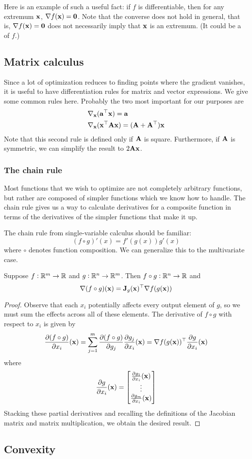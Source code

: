 Here is an example of such a useful fact: if $f$ is differentiable, then for any extremum $\mathbf{x}$, $\nabla f(\mathbf{x}) = \mathbf{0}$.
Note that the converse does not hold in general, that is, $\nabla f(\mathbf{x}) = \mathbf{0}$ does not necessarily imply that $\mathbf{x}$ is an extremum.
(It could be a  of $f$.)

\subsection{Matrix calculus}
Since a lot of optimization reduces to finding points where the gradient vanishes, it is useful to have differentiation rules for matrix and vector expressions.
We give some common rules here.
Probably the two most important for our purposes are
\begin{align*}
\nabla_{\mathbf{x}} &(\mathbf{a}^\top\mathbf{x}) = \mathbf{a} \\
\nabla_{\mathbf{x}} &(\mathbf{x}^\top\mathbf{A}\mathbf{x}) = (\mathbf{A} + \mathbf{A}^\top)\mathbf{x}
\end{align*}
Note that this second rule is defined only if $\mathbf{A}$ is square.
Furthermore, if $\mathbf{A}$ is symmetric, we can simplify the result to $2\mathbf{A}\mathbf{x}$.

\subsubsection{The chain rule}
Most functions that we wish to optimize are not completely arbitrary functions, but rather are composed of simpler functions which we know how to handle.
The chain rule gives us a way to calculate derivatives for a composite function in terms of the derivatives of the simpler functions that make it up.

The chain rule from single-variable calculus should be familiar:
\[(f \circ g)'(x) = f'(g(x))g'(x)\]
where $\circ$ denotes function composition.
We can generalize this to the multivariate case.
\begin{proposition}
Suppose $f : \mathbb{R}^m \to \mathbb{R}$ and $g : \mathbb{R}^n \to \mathbb{R}^m$. Then $f \circ g : \mathbb{R}^n \to \mathbb{R}$ and
\[\nabla (f \circ g)(\mathbf{x}) = \mathbf{J}_g(\mathbf{x})^\top \nabla f(g(\mathbf{x}))\]
\end{proposition}
\begin{proof}
Observe that each $x_i$ potentially affects every output element of $g$, so we must sum the effects across all of these elements.
The derivative of $f \circ g$ with respect to $x_i$ is given by
\[{\pdv{(f \circ g)}{x_i}}(\mathbf{x}) = \sum_{j=1}^m {\pdv{(f \circ g)}{g_j}\pdv{g_j}{x_i}}(\mathbf{x}) = \nabla f(g(\mathbf{x}))^\top {\pdv{g}{x_i}}(\mathbf{x})\]
where
\[{\pdv{g}{x_i}}(\mathbf{x}) = \begin{bmatrix}
{\pdv{g_1}{x_i}}(\mathbf{x}) \\
\vdots \\
{\pdv{g_m}{x_i}}(\mathbf{x})
\end{bmatrix}\]
Stacking these partial derivatives and recalling the definitions of the Jacobian matrix and matrix multiplication, we obtain the desired result.
\end{proof}

\subsection{Convexity}

